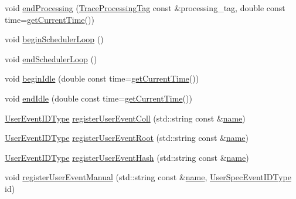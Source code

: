 \begin{DoxyCompactItemize}
\item 
void \hyperlink{structvt_1_1trace_1_1_trace_a18f66e844acc133fce37c2c9d9f939e0}{end\+Processing} (\hyperlink{structvt_1_1trace_1_1_trace_processing_tag}{Trace\+Processing\+Tag} const \&processing\+\_\+tag, double const time=\hyperlink{structvt_1_1trace_1_1_trace_a04cf6b76b4ced1bc90d246a34c948db5}{get\+Current\+Time}())
\item 
void \hyperlink{structvt_1_1trace_1_1_trace_a0e6566503861138843e7dc0a9ba30180}{begin\+Scheduler\+Loop} ()
\item 
void \hyperlink{structvt_1_1trace_1_1_trace_ad7ee4fc8c75874a524ce7cc1501209fd}{end\+Scheduler\+Loop} ()
\item 
void \hyperlink{structvt_1_1trace_1_1_trace_a530af1b7b48cf389744325f6f7e7f05e}{begin\+Idle} (double const time=\hyperlink{structvt_1_1trace_1_1_trace_a04cf6b76b4ced1bc90d246a34c948db5}{get\+Current\+Time}())
\item 
void \hyperlink{structvt_1_1trace_1_1_trace_a0262f4025460c9d61cac60420e75ef77}{end\+Idle} (double const time=\hyperlink{structvt_1_1trace_1_1_trace_a04cf6b76b4ced1bc90d246a34c948db5}{get\+Current\+Time}())
\item 
\hyperlink{namespacevt_1_1trace_a5908920d051c144c89f17c69ed262350}{User\+Event\+I\+D\+Type} \hyperlink{structvt_1_1trace_1_1_trace_a9a106f7f39e605745994d20bb526f8cf}{register\+User\+Event\+Coll} (std\+::string const \&\hyperlink{structvt_1_1trace_1_1_trace_aaae4bbf6d009229a5c8b9db67a127942}{name})
\item 
\hyperlink{namespacevt_1_1trace_a5908920d051c144c89f17c69ed262350}{User\+Event\+I\+D\+Type} \hyperlink{structvt_1_1trace_1_1_trace_a99fcca49a5506c3ee5cda67e541e37cc}{register\+User\+Event\+Root} (std\+::string const \&\hyperlink{structvt_1_1trace_1_1_trace_aaae4bbf6d009229a5c8b9db67a127942}{name})
\item 
\hyperlink{namespacevt_1_1trace_a5908920d051c144c89f17c69ed262350}{User\+Event\+I\+D\+Type} \hyperlink{structvt_1_1trace_1_1_trace_a1b80a8ca6bebbfbe61f8b119342e14f7}{register\+User\+Event\+Hash} (std\+::string const \&\hyperlink{structvt_1_1trace_1_1_trace_aaae4bbf6d009229a5c8b9db67a127942}{name})
\item 
void \hyperlink{structvt_1_1trace_1_1_trace_ade8d39718f60924f1aeb178ccda56cbc}{register\+User\+Event\+Manual} (std\+::string const \&\hyperlink{structvt_1_1trace_1_1_trace_aaae4bbf6d009229a5c8b9db67a127942}{name}, \hyperlink{namespacevt_1_1trace_a70c43e0e1596eea236912d4197d3120a}{User\+Spec\+Event\+I\+D\+Type} id)
\item 

\end{DoxyCompactItemize}
